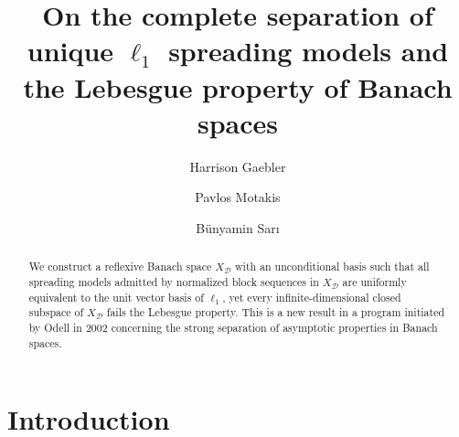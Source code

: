 \documentclass[12pt,a4paper]{amsart}
\title[Separation of $\ell_{1}$ spreading models and the Lebesgue property]{On the complete separation of unique $\ell_{1}$ spreading models and the Lebesgue property of Banach spaces}
\author{Harrison Gaebler}
\author{Pavlos Motakis}
\author{B\"unyamin Sar\i}
\theoremstyle{definition}
\theoremstyle{plain}
\begin{document}
\maketitle







\begin{abstract}
We construct a reflexive Banach space $X_\mathcal{D}$ with an unconditional basis such that all spreading models admitted by normalized block sequences in $X_\mathcal{D}$ are uniformly equivalent to the unit vector basis of $\ell_1$, yet every infinite-dimensional closed subspace of $X_\mathcal{D}$ fails the Lebesgue property. This is a new result in a program initiated by Odell in 2002 concerning the strong separation of asymptotic properties in Banach spaces.
\end{abstract}







\section{Introduction}{\label{sec1}}
\end{document}
